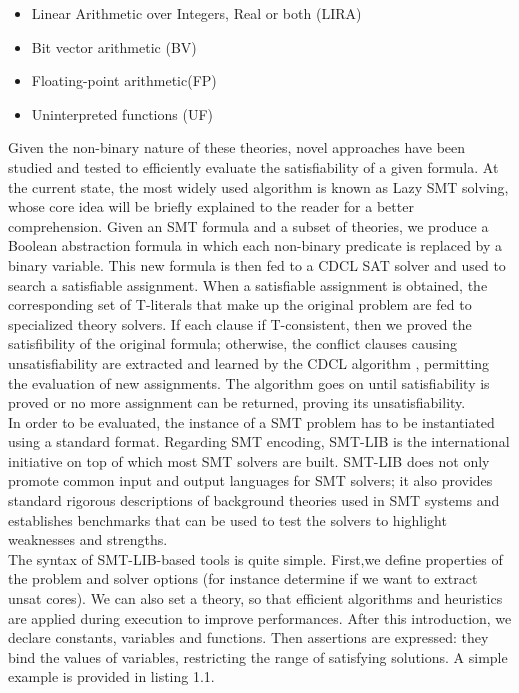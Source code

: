 \begin{itemize}
    \item Linear Arithmetic over Integers, Real or both (LIRA)
    \item Bit vector arithmetic (BV)
    \item Floating-point arithmetic(FP)
    \item Uninterpreted functions (UF)
\end{itemize}

Given the non-binary nature of these theories, novel approaches have been studied and tested to efficiently evaluate the satisfiability of a given formula. At the current state, the most widely used algorithm is known as Lazy SMT solving, whose core idea will be briefly explained to the reader for a better comprehension. Given an SMT formula and a subset of theories, we produce a Boolean abstraction formula in which each non-binary predicate is replaced by a binary variable. This new formula is then fed to a CDCL SAT solver and used to search a satisfiable assignment. When a satisfiable assignment is obtained, the corresponding set of T-literals that make up the original problem are fed to specialized theory solvers. If each clause if T-consistent, then we proved the satisfibility of the original formula; otherwise, the conflict clauses causing unsatisfiability are extracted and learned by the CDCL algorithm , permitting the evaluation of new assignments. The algorithm goes on until satisfiability is proved or no more assignment can be returned, proving its unsatisfiability. \\
In order to be evaluated, the instance of a SMT problem has to be instantiated using a standard format. Regarding SMT encoding, SMT-LIB is the international initiative on top of which most SMT solvers are built. SMT-LIB does not only promote common input and output languages for SMT solvers; it also provides standard rigorous descriptions of background theories used in SMT systems and establishes benchmarks that can be used to test the solvers to highlight weaknesses and strengths. \\
The syntax of SMT-LIB-based tools is quite simple. First,we define properties of the problem and solver options (for instance determine if we want to extract unsat cores). We can also set a theory, so that efficient algorithms and heuristics are applied during execution to improve performances. After this introduction, we declare constants, variables and functions. Then assertions are expressed: they bind the values of variables, restricting the range of satisfying solutions. A simple example is provided in listing 1.1. \\

